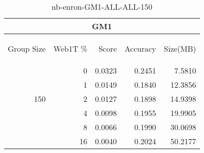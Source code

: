 \begin{center}
\begin{table}[htbp] 
 \begin{center}
\begin{tabular}{ | r | r | r | r | r |}
\hline
\multicolumn{5}{|c|}{GM1}\\
\hline
\begin{sideways}Group Size\end{sideways} & \begin{sideways}Web1T \%\end{sideways} & \begin{sideways}Score\end{sideways} & \begin{sideways}Accuracy\end{sideways} & \begin{sideways}Size(MB)\end{sideways}\\
\hline
\multirow{5}{*}{150}
 & 0 & 0.0323 & 0.2451 & 7.5810\\ \cline{2-5}
 & 1 & 0.0149 & 0.1840 & 12.3856\\ \cline{2-5}
 & 2 & 0.0127 & 0.1898 & 14.9398\\ \cline{2-5}
 & 4 & 0.0098 & 0.1955 & 19.9905\\ \cline{2-5}
 & 8 & 0.0066 & 0.1990 & 30.0698\\ \cline{2-5}
 & 16 & 0.0040 & 0.2024 & 50.2177\\ \cline{2-5}
\hline
\end{tabular}
\caption{nb-enron-GM1-ALL-ALL-150}
\label{table:nb-enron-GM1-ALL-ALL-150}
\end{center}
 \end{table}
\end{center}

